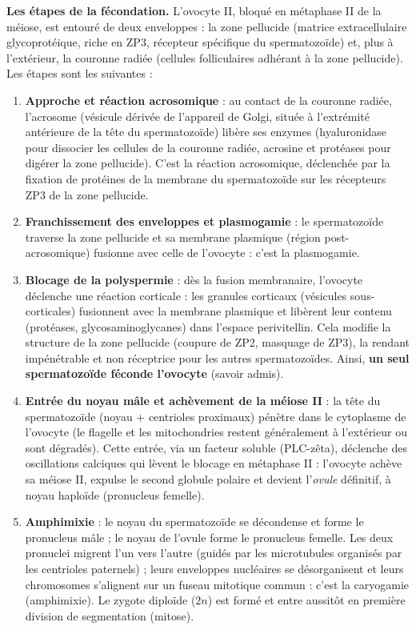 \documentclass[11pt]{article}
\newcommand{\cle}[1]{{\popxbold\color{popdark}#1}}
\begin{document}
\textbf{Les étapes de la fécondation.} L'ovocyte II, bloqué en métaphase II de la méiose, est entouré de deux enveloppes : la \cle{zone pellucide} (matrice extracellulaire glycoprotéique, riche en ZP3, récepteur spécifique du spermatozoïde) et, plus à l'extérieur, la \cle{couronne radiée} (cellules folliculaires adhérant à la zone pellucide). Les étapes sont les suivantes :

\begin{enumerate}
\item \textbf{Approche et réaction acrosomique} : au contact de la couronne radiée, l'\cle{acrosome} (vésicule dérivée de l'appareil de Golgi, située à l'extrémité antérieure de la tête du spermatozoïde) libère ses enzymes (hyaluronidase pour dissocier les cellules de la couronne radiée, acrosine et protéases pour digérer la zone pellucide). C'est la \cle{réaction acrosomique}, déclenchée par la fixation de protéines de la membrane du spermatozoïde sur les récepteurs ZP3 de la zone pellucide.
\item \textbf{Franchissement des enveloppes et plasmogamie} : le spermatozoïde traverse la zone pellucide et sa membrane plasmique (région post-acrosomique) fusionne avec celle de l'ovocyte : c'est la plasmogamie.
\item \textbf{Blocage de la polyspermie} : dès la fusion membranaire, l'ovocyte déclenche une \cle{réaction corticale} : les \cle{granules corticaux} (vésicules sous-corticales) fusionnent avec la membrane plasmique et libèrent leur contenu (protéases, glycosaminoglycanes) dans l'espace perivitellin. Cela modifie la structure de la zone pellucide (coupure de ZP2, masquage de ZP3), la rendant impénétrable et non réceptrice pour les autres spermatozoïdes. Ainsi, \textbf{un seul spermatozoïde féconde l'ovocyte} (savoir admis).
\item \textbf{Entrée du noyau mâle et achèvement de la méiose II} : la tête du spermatozoïde (noyau + centrioles proximaux) pénètre dans le cytoplasme de l'ovocyte (le flagelle et les mitochondries restent généralement à l'extérieur ou sont dégradés). Cette entrée, via un facteur soluble (PLC-zêta), déclenche des oscillations calciques qui lèvent le blocage en métaphase II : l'ovocyte achève sa méiose II, expulse le \cle{second globule polaire} et devient l'\emph{ovule} définitif, à noyau haploïde (pronucleus femelle).
\item \textbf{Amphimixie} : le noyau du spermatozoïde se décondense et forme le \cle{pronucleus mâle} ; le noyau de l'ovule forme le \cle{pronucleus femelle}. Les deux pronuclei migrent l'un vers l'autre (guidés par les microtubules organisés par les centrioles paternels) ; leurs enveloppes nucléaires se désorganisent et leurs chromosomes s'alignent sur un fuseau mitotique commun : c'est la caryogamie (amphimixie). Le \cle{zygote} diploïde ($2n$) est formé et entre aussitôt en première division de segmentation (mitose).
\end{enumerate}
\end{document}
